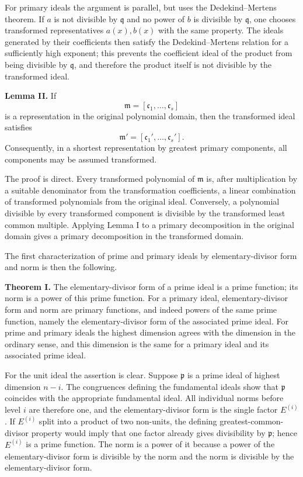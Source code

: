 \documentclass[11pt]{article}
\begin{document}
For primary ideals the argument is parallel, but uses the Dedekind--Mertens theorem. If $a$ is not divisible by $\mathfrak q$ and no power of $b$ is divisible by $\mathfrak q$, one chooses transformed representatives $a(x),b(x)$ with the same property. The ideals generated by their coefficients then satisfy the Dedekind--Mertens relation for a sufficiently high exponent; this prevents the coefficient ideal of the product from being divisible by $\mathfrak q$, and therefore the product itself is not divisible by the transformed ideal.

\textbf{Lemma II.} If
\[
  \mathfrak m=[\mathfrak c_1,\ldots,\mathfrak c_s]
\]
is a representation in the original polynomial domain, then the transformed ideal satisfies
\[
  \mathfrak m'=[\mathfrak c_1',\ldots,\mathfrak c_s'].
\]
Consequently, in a shortest representation by greatest primary components, all components may be assumed transformed.

The proof is direct. Every transformed polynomial of $\mathfrak m$ is, after multiplication by a suitable denominator from the transformation coefficients, a linear combination of transformed polynomials from the original ideal. Conversely, a polynomial divisible by every transformed component is divisible by the transformed least common multiple. Applying Lemma I to a primary decomposition in the original domain gives a primary decomposition in the transformed domain.

The first characterization of prime and primary ideals by elementary-divisor form and norm is then the following.

\textbf{Theorem I.} The elementary-divisor form of a prime ideal is a prime function; its norm is a power of this prime function. For a primary ideal, elementary-divisor form and norm are primary functions, and indeed powers of the same prime function, namely the elementary-divisor form of the associated prime ideal. For prime and primary ideals the highest dimension agrees with the dimension in the ordinary sense, and this dimension is the same for a primary ideal and its associated prime ideal.

For the unit ideal the assertion is clear. Suppose $\mathfrak p$ is a prime ideal of highest dimension $n-i$. The congruences defining the fundamental ideals show that $\mathfrak p$ coincides with the appropriate fundamental ideal. All individual norms before level $i$ are therefore one, and the elementary-divisor form is the single factor $E^{(i)}$. If $E^{(i)}$ split into a product of two non-units, the defining greatest-common-divisor property would imply that one factor already gives divisibility by $\mathfrak p$; hence $E^{(i)}$ is a prime function. The norm is a power of it because a power of the elementary-divisor form is divisible by the norm and the norm is divisible by the elementary-divisor form.
\end{document}
